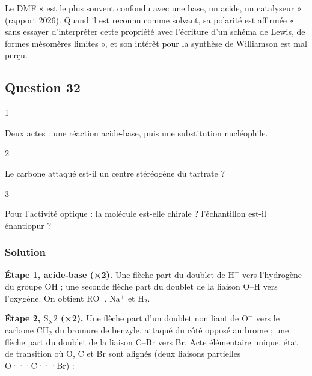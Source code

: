 \documentclass[11pt,a4paper]{article}
\begin{document}
\begin{jury}

Le DMF « est le plus souvent confondu avec une base, un acide, un catalyseur » (rapport 2026). Quand il est reconnu comme solvant, sa polarité est affirmée « sans essayer d'interpréter cette propriété avec l'écriture d'un schéma de Lewis, de formes mésomères limites », et son intérêt pour la synthèse de Williamson est mal perçu.

\end{jury}

\hypertarget{question-32}{%
\subsection{Question 32}\label{question-32}}

\begin{indication}{1}

Deux actes : une réaction acide-base, puis une substitution nucléophile.

\end{indication}

\begin{indication}{2}

Le carbone attaqué est-il un centre stéréogène du tartrate ?

\end{indication}

\begin{indication}{3}

Pour l'activité optique : la molécule est-elle chirale ? l'échantillon est-il énantiopur ?

\end{indication}

\hypertarget{solution-31}{%
\subsubsection{Solution}\label{solution-31}}

\textbf{Étape 1, acide-base (×2).} Une flèche part du doublet de \(\mathrm{H^-}\) vers l'hydrogène du groupe OH ; une seconde flèche part du doublet de la liaison O--H vers l'oxygène. On obtient \(\mathrm{RO^-}\), \(\mathrm{Na^+}\) et \(\mathrm{H_2}\).

\textbf{Étape 2, \(\mathrm{S_N2}\) (×2).} Une flèche part d'un doublet non liant de \(\mathrm{O^-}\) vers le carbone \(\mathrm{CH_2}\) du bromure de benzyle, attaqué du côté opposé au brome ; une flèche part du doublet de la liaison C--Br vers Br. Acte élémentaire unique, état de transition où O, C et Br sont alignés (deux liaisons partielles O···C···Br) :
\end{document}

